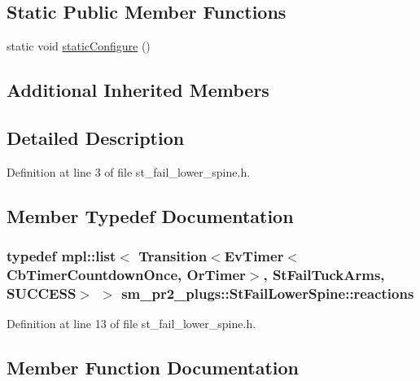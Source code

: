 \subsection*{Static Public Member Functions}
\begin{DoxyCompactItemize}
\item 
static void \hyperlink{structsm__pr2__plugs_1_1StFailLowerSpine_a11a49e55ac8e400fa3587ac15ecfb2a8}{static\+Configure} ()
\end{DoxyCompactItemize}
\subsection*{Additional Inherited Members}


\subsection{Detailed Description}


Definition at line 3 of file st\+\_\+fail\+\_\+lower\+\_\+spine.\+h.



\subsection{Member Typedef Documentation}
\subsubsection[{\texorpdfstring{reactions}{reactions}}]{\setlength{\rightskip}{0pt plus 5cm}typedef mpl\+::list$<$ Transition$<$Ev\+Timer$<$Cb\+Timer\+Countdown\+Once, {\bf Or\+Timer}$>$, {\bf St\+Fail\+Tuck\+Arms}, {\bf S\+U\+C\+C\+E\+SS}$>$ $>$ {\bf sm\+\_\+pr2\+\_\+plugs\+::\+St\+Fail\+Lower\+Spine\+::reactions}}\hypertarget{structsm__pr2__plugs_1_1StFailLowerSpine_a84201506710211472a927aaaf1fbffd4}{}\label{structsm__pr2__plugs_1_1StFailLowerSpine_a84201506710211472a927aaaf1fbffd4}


Definition at line 13 of file st\+\_\+fail\+\_\+lower\+\_\+spine.\+h.



\subsection{Member Function Documentation}
